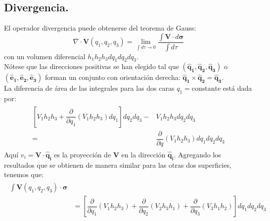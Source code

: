 \subsection{Divergencia.}
El operador divergencia puede obtenerse del teorema de Gauss:
\begin{equation}
\nabla \cdot \mathbf{V}(q_{1},q_{2},q_{3}) = \lim_{\int d \tau \to 0} \dfrac{\int \mathbf{V}\cdot d \bm{\sigma}}{\int d \tau}
\label{eq:ecuacion_02_19}
\end{equation}
con un volumen diferencial $h_{1}h_{2}h_{3}dq_{1}dq_{2}dq_{3}$.
\\
Nótese que las direcciones positivas se han elegido tal que $(\mathbf{\widehat{q}_{1}},\mathbf{\widehat{q}_{2}}, \mathbf{\widehat{q}_{3}})$ o $(\mathbf{\widehat{e}_{1}},\mathbf{\widehat{e}_{2}}, \mathbf{\widehat{e}_{3}})$ forman un conjunto con orientación derecha: $\mathbf{\widehat{q}_{1}} \times\mathbf{\widehat{q}_{2}} = \mathbf{\widehat{q}_{3}}$.
\\
La diferencia de área de las integrales para las dos caras $q_{1} = \text{constante}$ está dada por:
\begin{eqnarray}
\begin{aligned}
\left[ V_{1} h_{2} h_{3} + \dfrac{\partial}{\partial q_{1}} (V_{1}h_{2}h_{3}) dq_{1} \right] dq_{2} dq_{3} -& V_{1} h_{2}h_{3} dq_{2} dq_{3} \\
=& \dfrac{\partial}{\partial q} (V_{1}h_{2}h_{3}) dq_{1} dq_{2} dq_{3}
\end{aligned}
\label{eq:ecuacion_02_20}
\end{eqnarray}
Aquí  $v_{i} = \mathbf{V} \cdot \mathbf{\widehat{q}_{i}}$ es la proyección de $\mathbf{V}$ en la dirección  $\mathbf{\widehat{q}_{i}}$. Agregando los resultados que se obtienen de manera similar para las otras dos superficies, tenemos que:
\begin{eqnarray}
\begin{aligned}
\int \mathbf{V}(q_{1},q_{2},q_{3}) \cdot \bm{\sigma}  \\
&= \left[ \dfrac{\partial}{\partial q_{1}} (V_{1} h_{2} h_{3}) + \dfrac{\partial}{\partial q_{2}} (V_{2} h_{3} h_{1}) +
\dfrac{\partial}{\partial q_{3}} (V_{3} h_{1} h_{2}) \right] dq_{1} dq_{2} dq_{3}
\end{aligned}
\end{eqnarray}
